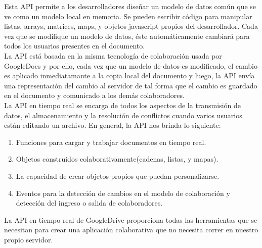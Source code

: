 Esta API permite a los desarrolladores diseñar un modelo de datos común que se ve como un modelo local en memoria. Se pueden escribir código para manipular listas, arrays, matrices, maps, y objetos javascript propios del desarrollador. Cada vez que se modifique un modelo de datos, éste automáticamente cambiará para todos los usuarios presentes en el documento.\\

La API está basada en la misma tecnología de colaboración usada por GoogleDocs y por ello, cada vez que un modelo de datos es modificado, el cambio es aplicado inmediatamante a la copia local del documento y luego, la API envía una representación del cambio al servidor de tal forma que el cambio es guardado en el documento y comunicado a los demás colaboradores.\\

La API en tiempo real se encarga de todos los aspectos de la transmisión de datos, el almacenamiento y la resolución de conflictos cuando varios usuarios están editando un archivo. En general, la API nos brinda lo siguiente:

\begin{enumerate}
  \item Funciones para cargar y trabajar documentos en tiempo real.
  \item Objetos construídos colaborativamente(cadenas, listas, y mapas).
  \item La capacidad de crear objetos propios que puedan personalizarse.
  \item Eventos para la detección de cambios en el modelo de colaboración y detección del ingreso o salida de colaboradores.
\end{enumerate}
La API en tiempo real de GoogleDrive proporciona todas las herramientas que se necesitan para crear una aplicación colaborativa que no necesita correr en nuestro propio servidor.


%

